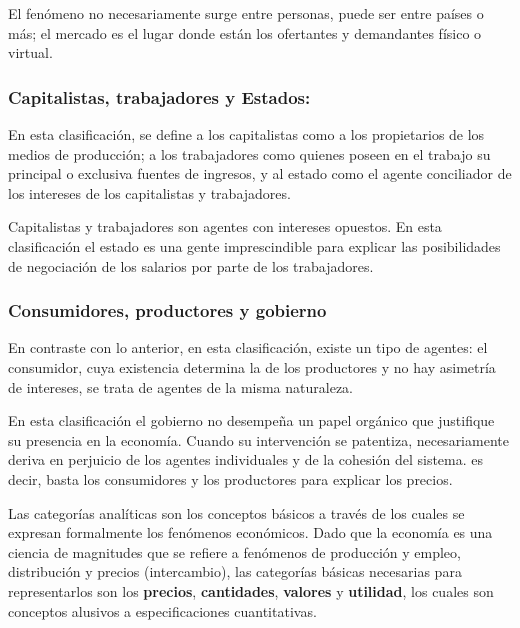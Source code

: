El fenómeno no necesariamente surge entre personas, puede ser entre países o más; el mercado es el lugar donde están los ofertantes y demandantes físico o virtual.

\subsubsection{Capitalistas, trabajadores y Estados:} 
En esta clasificación, se define a los capitalistas como a los propietarios de los medios de producción; a los trabajadores como quienes poseen en el trabajo su principal o exclusiva fuentes de ingresos, y al estado como el agente conciliador de los intereses de los capitalistas y trabajadores.

Capitalistas y trabajadores son agentes con intereses opuestos. En esta clasificación el estado es una gente imprescindible para explicar las posibilidades de negociación de los salarios por parte de los trabajadores.

\subsubsection{Consumidores, productores y gobierno}
En contraste con lo anterior, en esta clasificación, existe un tipo de agentes: el consumidor, cuya existencia determina la de los productores y no hay asimetría de intereses, se trata de agentes de la misma naturaleza.

En esta clasificación el gobierno no desempeña un papel orgánico que justifique su presencia en la economía. Cuando su intervención se patentiza, necesariamente deriva en perjuicio de los agentes individuales y de la cohesión del sistema. es decir, basta los consumidores y los productores para explicar los precios.

Las categorías analíticas son los conceptos básicos a través de los cuales se expresan formalmente los fenómenos económicos. Dado que la economía es una ciencia de magnitudes que se refiere a fenómenos de producción y empleo, distribución y precios (intercambio), las categorías básicas necesarias para representarlos son los \textbf{precios}, \textbf{cantidades}, \textbf{valores} y \textbf{utilidad}, los cuales son conceptos alusivos a especificaciones cuantitativas.

